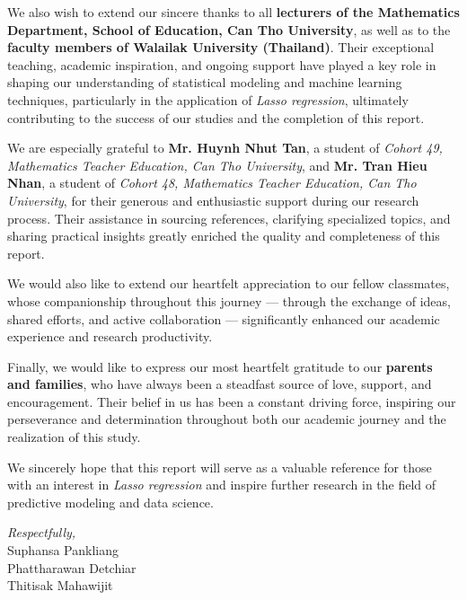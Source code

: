 \documentclass[12pt, a4paper]{report}
\begin{document}
\medskip

We also wish to extend our sincere thanks to all \textbf{lecturers of the Mathematics Department, School of Education, Can Tho University}, as well as to the \textbf{faculty members of Walailak University (Thailand)}. Their exceptional teaching, academic inspiration, and ongoing support have played a key role in shaping our understanding of statistical modeling and machine learning techniques, particularly in the application of \textit{Lasso regression}, ultimately contributing to the success of our studies and the completion of this report.

\medskip

We are especially grateful to \textbf{Mr. Huynh Nhut Tan}, a student of \textit{Cohort 49, Mathematics Teacher Education, Can Tho University}, and \textbf{Mr. Tran Hieu Nhan}, a student of \textit{Cohort 48, Mathematics Teacher Education, Can Tho University}, for their generous and enthusiastic support during our research process. Their assistance in sourcing references, clarifying specialized topics, and sharing practical insights greatly enriched the quality and completeness of this report.

\medskip

We would also like to extend our heartfelt appreciation to our fellow classmates, whose companionship throughout this journey — through the exchange of ideas, shared efforts, and active collaboration — significantly enhanced our academic experience and research productivity.

\medskip

Finally, we would like to express our most heartfelt gratitude to our \textbf{parents and families}, who have always been a steadfast source of love, support, and encouragement. Their belief in us has been a constant driving force, inspiring our perseverance and determination throughout both our academic journey and the realization of this study.

\medskip

We sincerely hope that this report will serve as a valuable reference for those with an interest in \textit{Lasso regression} and inspire further research in the field of predictive modeling and data science.


\begin{flushright}
\textit{Respectfully,} \\
Suphansa Pankliang \\
Phattharawan Detchiar\\
Thitisak Mahawijit
\end{flushright}
\end{document}
